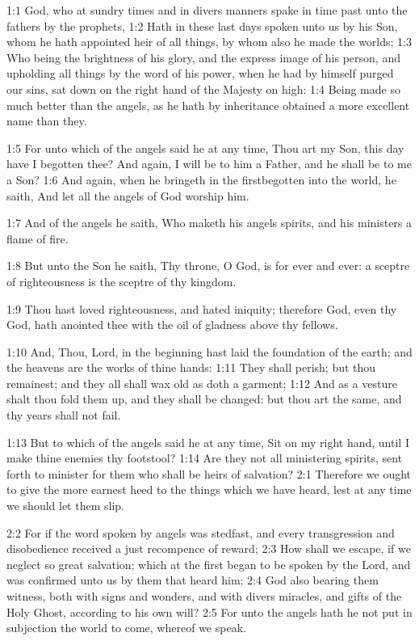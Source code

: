 

1:1 God, who at sundry times and in divers manners spake in time past
unto the fathers by the prophets, 1:2 Hath in these last days spoken
unto us by his Son, whom he hath appointed heir of all things, by whom
also he made the worlds; 1:3 Who being the brightness of his glory,
and the express image of his person, and upholding all things by the
word of his power, when he had by himself purged our sins, sat down on
the right hand of the Majesty on high: 1:4 Being made so much better
than the angels, as he hath by inheritance obtained a more excellent
name than they.

1:5 For unto which of the angels said he at any time, Thou art my Son,
this day have I begotten thee? And again, I will be to him a Father,
and he shall be to me a Son?  1:6 And again, when he bringeth in the
firstbegotten into the world, he saith, And let all the angels of God
worship him.

1:7 And of the angels he saith, Who maketh his angels spirits, and his
ministers a flame of fire.

1:8 But unto the Son he saith, Thy throne, O God, is for ever and
ever: a sceptre of righteousness is the sceptre of thy kingdom.

1:9 Thou hast loved righteousness, and hated iniquity; therefore God,
even thy God, hath anointed thee with the oil of gladness above thy
fellows.

1:10 And, Thou, Lord, in the beginning hast laid the foundation of the
earth; and the heavens are the works of thine hands: 1:11 They shall
perish; but thou remainest; and they all shall wax old as doth a
garment; 1:12 And as a vesture shalt thou fold them up, and they shall
be changed: but thou art the same, and thy years shall not fail.

1:13 But to which of the angels said he at any time, Sit on my right
hand, until I make thine enemies thy footstool?  1:14 Are they not all
ministering spirits, sent forth to minister for them who shall be
heirs of salvation?  2:1 Therefore we ought to give the more earnest
heed to the things which we have heard, lest at any time we should let
them slip.

2:2 For if the word spoken by angels was stedfast, and every
transgression and disobedience received a just recompence of reward;
2:3 How shall we escape, if we neglect so great salvation; which at
the first began to be spoken by the Lord, and was confirmed unto us by
them that heard him; 2:4 God also bearing them witness, both with
signs and wonders, and with divers miracles, and gifts of the Holy
Ghost, according to his own will?  2:5 For unto the angels hath he not
put in subjection the world to come, whereof we speak.

